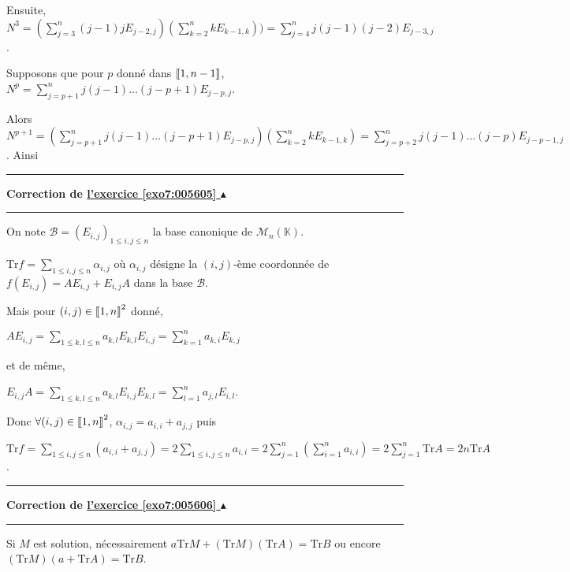 \documentclass[11pt,a4paper]{article}
\newcommand{\Kk}{\mathbb{K}} \newcommand{\K}{\mathbb{K}}
\newcommand{\llbracket}{\left[\kern-0.15em\left[}
\newcommand{\rrbracket}{\right]\kern-0.15em\right]}
\newcounter{exo}
\newcommand{\correction}[1]{\hypertarget{cor7:#1}{}\label{cor7:#1}{\bf Correction de \hyperlink{exo7:#1}{l'exercice \ref{exo7:#1} $\blacktriangle$}}\vspace{1mm}\hrule\vspace{1mm}}
\newcommand{\fincorrection}{\vspace{1mm}\hrule\vspace*{7mm}}
\begin{document}
Ensuite, $N^3=\left(\sum_{j=3}^{n}(j-1)jE_{j-2,j}\right)\left(\sum_{k=2}^{n}kE_{k-1,k}\right)) =\sum_{j=4}^{n}j(j-1)(j-2)E_{j-3,j}$.

Supposons que pour $p$ donné dans $\llbracket1,n-1\rrbracket$, $N^p=\sum_{j=p+1}^{n}j(j-1)...(j-p+1)E_{j-p,j}$.

Alors $N^{p+1}=\left(\sum_{j=p+1}^{n}j(j-1)...(j-p+1)E_{j-p,j}\right)\left(\sum_{k=2}^{n}kE_{k-1,k}\right)=\sum_{j=p+2}^{n}j(j-1)...(j-p)E_{j-p-1,j}$. Ainsi 

\begin{center}
\end{center}
\fincorrection
\correction{005605}
On note $\mathcal{B}=(E_{i,j})_{1\leqslant i,j\leqslant n}$ la base canonique de $\mathcal{M}_n(\Kk)$.

$\text{Tr}f=\sum_{1\leqslant i,j\leqslant n}^{}\alpha_{i,j}$ où $\alpha_{i,j}$ désigne la $(i,j)$-ème coordonnée de $f(E_{i,j})=AE_{i,j}+E_{i,j}A$ dans la base $\mathcal{B}$.

Mais pour $(i,j)\in\llbracket1,n\rrbracket^2$ donné, 

\begin{center}
$AE_{i,j}=\sum_{1\leqslant k,l\leqslant n}^{}a_{k,l}E_{k,l}E_{i,j}=\sum_{k=1}^{n}a_{k,i}E_{k,j}$
\end{center}

et de même,

\begin{center}
$E_{i,j}A=\sum_{1\leqslant k,l\leqslant n}^{}a_{k,l}E_{i,j}E_{k,l}=\sum_{l=1}^{n}a_{j,l}E_{i,l}$.
\end{center}

Donc $\forall(i,j)\in\llbracket1,n\rrbracket^2$, $\alpha_{i,j}=a_{i,i}+a_{j,j}$ puis

\begin{center}
$\text{Tr}f=\sum_{1\leqslant i,j\leqslant n}^{}(a_{i,i}+a_{j,j})=2\sum_{1\leqslant i,j\leqslant n}^{}a_{i,i}=2\sum_{j=1}^{n}\left(\sum_{i=1}^{n}a_{i,i}\right)=2\sum_{j=1}^{n}\text{Tr}A=2n\text{Tr}A$.
\end{center}

\begin{center}
\end{center}
\fincorrection
\correction{005606}
Si $M$ est solution, nécessairement $a\text{Tr}M +(\text{Tr}M)(\text{Tr}A)=\text{Tr}B$ ou encore $(\text{Tr}M)(a+\text{Tr}A) =\text{Tr}B$.
\end{document}
